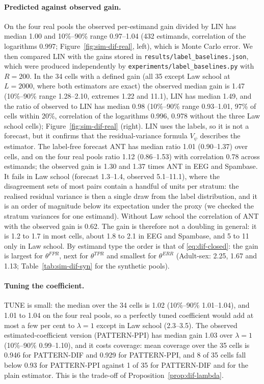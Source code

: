 \documentclass[pdflatex,sn-mathphys-num,iicol]{sn-jnl}
\theoremstyle{thmstyleone}
\theoremstyle{thmstyletwo}
\theoremstyle{thmstylethree}
\begin{document}
\paragraph{Predicted against observed gain.} On the four real pools the observed per-estimand gain divided by LIN has median 1.00 and 10\%--90\% range 0.97--1.04 (432 estimands, correlation of the logarithms 0.997; Figure~\ref{fig:sim-dif-real}, left), which
is Monte Carlo error. We then compared LIN with the gains stored in \texttt{results/label\_baselines.json}, which were produced independently by \texttt{experiments/label\_baselines.py} with $R=200$. In the 34 cells with a defined gain (all 35 except Law school at
$L=2000$, where both estimators are exact) the observed median gain is 1.47 (10\%--90\% range 1.28--2.10, extremes 1.22 and 11.1), LIN has median 1.49, and the ratio of observed to LIN has median 0.98 (10\%--90\% range 0.93--1.01, 97\% of cells within 20\%, correlation of the logarithms 0.996, 0.978 without
the three Law school cells); Figure~\ref{fig:sim-dif-real} (right). LIN uses the labels, so it is not a forecast, but it confirms that the residual-variance formula $V_\psi$ describes the estimator. The label-free forecast
ANT has median ratio 1.01 (0.90--1.37) over cells, and on the four real pools ratio 1.12 (0.86--1.53) with correlation 0.78 across estimands; the observed gain is 1.30 and 1.37 times ANT in EEG and Spambase. It fails in Law school (forecast 1.3--1.4, observed 5.1--11.1), where the
disagreement sets of most pairs contain a handful of units per stratum: the realised residual variance is then a single draw from the label distribution, and it is an order of magnitude below its expectation under the proxy (we checked the stratum variances for one estimand). Without Law school the correlation of ANT with the observed gain is 0.62.
The gain is therefore not a doubling in general: it is 1.2 to 1.7 in most cells, about 1.8 to 2.1 in EEG and Spambase, and 5 to 11 only in Law school. By estimand type the order is that of \eqref{eq:dif-closed}: the gain is largest for $\theta^{FPR}$,
next for $\theta^{TPR}$ and smallest for $\theta^{ERR}$ (Adult-sex: 2.25, 1.67 and 1.13; Table~\ref{tab:sim-dif-syn} for the synthetic pools).

\paragraph{Tuning the coefficient.} TUNE is small: the median over the 34 cells is 1.02 (10\%--90\% 1.01--1.04), and 1.01 to 1.04 on the four real pools, so a perfectly tuned coefficient would add at most a few per cent to $\lambda=1$ except in Law school (2.3--3.5).
The observed estimated-coefficient version (PATTERN-PPI) has median gain 1.03 over $\lambda=1$ (10\%--90\% 0.99--1.10), and it costs coverage: mean coverage over the 35 cells is 0.946 for PATTERN-DIF and 0.929 for PATTERN-PPI, and 8 of 35 cells fall below 0.93 for PATTERN-PPI against 1 of 35 for PATTERN-DIF
and for the plain estimator. This is the trade-off of Proposition~\ref{prop:dif-lambda}.
\end{document}
